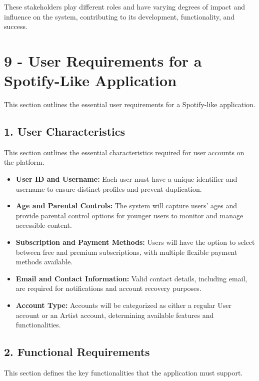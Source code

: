 \documentclass[a4paper,10pt]{article}
\begin{document}
These stakeholders play different roles and have varying degrees of impact and influence on the system, contributing to its development, functionality, and success.


\maketitle

\section*{9 - User Requirements for a Spotify-Like Application}
This section outlines the essential user requirements for a Spotify-like application.

\subsection*{1. User Characteristics}
This section outlines the essential characteristics required for user accounts on the platform.

\begin{itemize}[leftmargin=*]
    \item \textbf{User ID and Username:} Each user must have a unique identifier and username to ensure distinct profiles and prevent duplication.
    \item \textbf{Age and Parental Controls:} The system will capture users’ ages and provide parental control options for younger users to monitor and manage accessible content.
    \item \textbf{Subscription and Payment Methods:} Users will have the option to select between free and premium subscriptions, with multiple flexible payment methods available.
    \item \textbf{Email and Contact Information:} Valid contact details, including email, are required for notifications and account recovery purposes.
    \item \textbf{Account Type:} Accounts will be categorized as either a regular User account or an Artist account, determining available features and functionalities.
\end{itemize}

\subsection*{2. Functional Requirements}
This section defines the key functionalities that the application must support.
\end{document}
